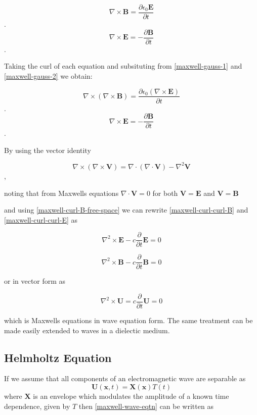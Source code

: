 \begin{equation}
 \nabla \times \mathbf{B} = \frac{\partial \epsilon_0 \mathbf{E}}{\partial t}
 \label{maxwell-curl-B-free-space}
\end{equation}.
\begin{equation}
 \nabla \times \mathbf{E} = - \frac{\partial \mathbf{B}}{\partial t}
\end{equation}.

Taking the curl of each equation and subsituting from \ref{maxwell-gauss-1} and \ref{maxwell-gauss-2} we obtain:

\begin{equation}
    \nabla \times ( \nabla \times \mathbf{B} ) = \frac{\partial \epsilon_0 ( \nabla \times \mathbf{E} ) }{\partial t}
    \label{maxwell-curl-curl-B}
\end{equation}.
\begin{equation}
 \nabla \times \mathbf{E} = - \frac{\partial \mathbf{B}}{\partial t}
    \label{maxwell-curl-curl-E}
\end{equation}.

By using the vector identity

$$
\nabla \times ( \nabla \times \mathbf{V} ) = \nabla \cdot ( \nabla \cdot \mathbf{V} ) - \nabla^2 \mathbf{V}
$$,

noting that from Maxwells equations $\nabla \cdot \mathbf{V} = 0$ for both $\mathbf{V} = \mathbf{E}$ and $\mathbf{V} = \mathbf{B}$

and using \eqref{maxwell-curl-B-free-space} we can rewrite \eqref{maxwell-curl-curl-B} and \eqref{maxwell-curl-curl-E} as

$$
\nabla^2 \times \mathbf{E} - c \frac{\partial}{\partial t} \mathbf{E} = 0
$$

$$
\nabla^2 \times \mathbf{B} - c \frac{\partial}{\partial t} \mathbf{B} = 0
$$

or in vector form as

\begin{equation}
\nabla^2 \times \mathbf{U} = c \frac{\partial}{\partial t} \mathbf{U} = 0
\label{maxwell-wave-eqtn}
\end{equation}

which is Maxwells equations in wave equation form. The same treatment can be made easily extended to waves in a dielectic medium.

\subsection{Helmholtz Equation}
If we assume that all components of an electromagnetic wave are separable as
$$
\mathbf{U}(\mathbf{x},t) = \mathbf{X}(\mathbf{x}) T(t)
$$
where $\mathbf{X}$ is an envelope which modulates the amplitude of a known time dependence, given by $T$ then \ref{maxwell-wave-eqtn} can be written as

